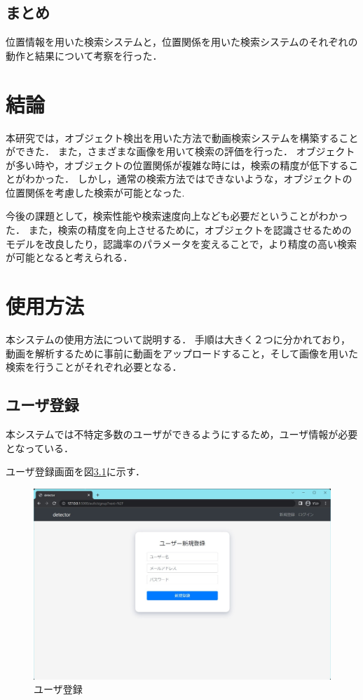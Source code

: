 \documentclass[a4j,12pt,dvipdfmx]{jreport}
\begin{document}
\section{まとめ}\label{chap4-5}
位置情報を用いた検索システムと，位置関係を用いた検索システムのそれぞれの動作と結果について考察を行った．


\chapter{結論}
\label{sec:conclusion}
本研究では，オブジェクト検出を用いた方法で動画検索システムを構築することができた．
また，さまざまな画像を用いて検索の評価を行った．
オブジェクトが多い時や，オブジェクトの位置関係が複雑な時には，検索の精度が低下することがわかった．
しかし，通常の検索方法ではできないような，オブジェクトの位置関係を考慮した検索が可能となった.

今後の課題として，検索性能や検索速度向上なども必要だということがわかった．
また，検索の精度を向上させるために，オブジェクトを認識させるためのモデルを改良したり，認識率のパラメータを変えることで，より精度の高い検索が可能となると考えられる．

\clearpage


\chapter{使用方法}
\label{sec:usage}
本システムの使用方法について説明する．
手順は大きく２つに分かれており，動画を解析するために事前に動画をアップロードすること，そして画像を用いた検索を行うことがそれぞれ必要となる．

\section{ユーザ登録}
本システムでは不特定多数のユーザができるようにするため，ユーザ情報が必要となっている．

ユーザ登録画面を図\ref{fig:user_register}に示す．

\begin{figure}[H]
  \centering
  \includegraphics[width=13cm]{image/user_register.jpg}
  \caption{ユーザ登録}
  \label{fig:user_register}
\end{figure}
\end{document}
